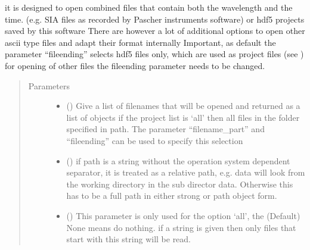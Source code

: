 \documentclass[letterpaper,10pt,english]{sphinxmanual}
\begin{document}
\begin{fulllineitems}
it is designed to open combined files that contain both the wavelength and the time. (e.g. SIA files as recorded by Pascher instruments software) or hdf5 projects saved by this software
There are however a lot of additional options to open other ascii type files and adapt their format internally
Important, as default the parameter “fileending” selects hdf5 files only, which are used as project files (see {\hyperref[\detokenize{plot_func:plot_func.TA.Save_project}]{}})
for opening of other files the fileending parameter needs to be changed.
\begin{quote}\begin{description}
\item[{Parameters}] \leavevmode\begin{itemize}
\item {} 
 (\sphinxstyleliteralemphasis{\sphinxupquote{ (}}\sphinxstyleliteralemphasis{\sphinxupquote{, }}) \textendash{} Give a list of filenames that will be opened and returned as a list of objects
if the project list is ‘all’ then all files in the folder specified in path. The parameter “filename\_part”
and “fileending” can be used to specify this selection

\item {} 
 (\sphinxstyleliteralemphasis{\sphinxupquote{ (}}\sphinxstyleliteralemphasis{\sphinxupquote{)}}) \textendash{} if path is a string without the operation system dependent separator, it is treated as a relative path,
e.g. data will look from the working directory in the sub director data. Otherwise this has to be a
full path in either strong or path object form.

\item {} 
 (\sphinxstyleliteralemphasis{\sphinxupquote{, }}) \textendash{} This parameter is only used for the option ‘all’, the (Default) None means do nothing. if a string is given then only
files that start with this string will be read.


\end{itemize}
\end{description}
\end{quote}
\end{fulllineitems}
\end{document}
